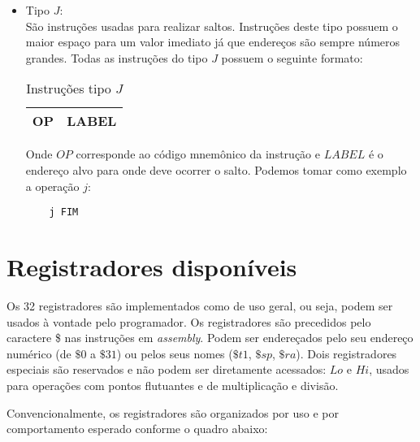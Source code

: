 \begin{itemize}
\item Tipo $J$:\\
São instruções usadas para realizar saltos. Instruções deste tipo possuem o maior espaço para um valor imediato já que endereços são sempre números grandes. Todas as instruções do tipo $J$ possuem o seguinte formato:\\

\begin{table}[h]
\centering
\caption{Instruções tipo $J$}
\label{tab:tipo_j}
\begin{tabular}{@{}|l|l|@{}}
\toprule 
OP & LABEL
 \\ \bottomrule
\end{tabular}
\end{table}

Onde $OP$ corresponde ao código mnemônico da instrução e $LABEL$ é o endereço alvo para onde deve ocorrer o salto. Podemos tomar como exemplo a operação $j$:\\

\begin{verbatim}
	j FIM
\end{verbatim}
\end{itemize}
\vspace{0.5cm}

\section{Registradores disponíveis}

Os 32 registradores são implementados como de uso geral, ou seja, podem ser usados à vontade pelo programador. Os registradores são precedidos pelo caractere \$ nas instruções em \textit{assembly}. Podem ser endereçados pelo seu endereço numérico (de $\$0$ a $\$31$) ou pelos seus nomes ($\$t1$, $\$sp$, $\$ra$). Dois registradores especiais são reservados e não podem ser diretamente acessados: $Lo$ e $Hi$, usados para operações com pontos flutuantes e de multiplicação e divisão.

Convencionalmente, os registradores são organizados por uso e por comportamento esperado conforme o quadro abaixo:\\

